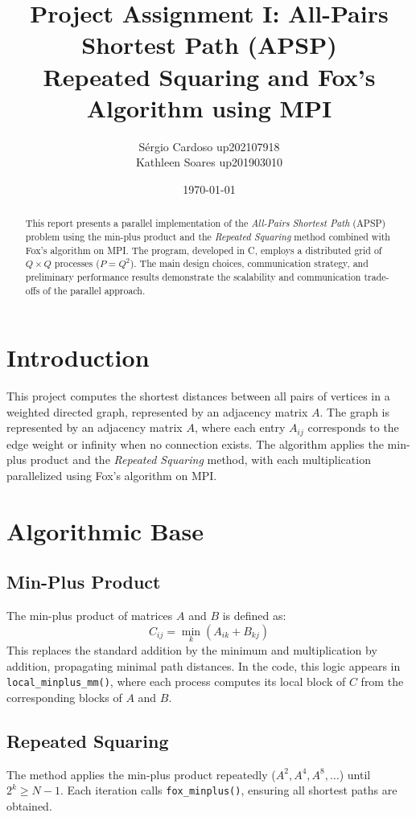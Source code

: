 \documentclass[10pt,a4paper]{article}
\title{\textbf{Project Assignment I: All-Pairs Shortest Path (APSP)}\\
\large Repeated Squaring and Fox’s Algorithm using MPI}
\author{Sérgio Cardoso up202107918 \\ Kathleen Soares up201903010}
\date{\today}
\begin{document}
\maketitle

\begin{abstract}
This report presents a parallel implementation of the \emph{All-Pairs Shortest Path} (APSP) problem using the min-plus product and the \emph{Repeated Squaring} method combined with Fox's algorithm on MPI. The program, developed in C, employs a distributed grid of \(Q \times Q\) processes (\(P = Q^2\)). The main design choices, communication strategy, and preliminary performance results demonstrate the scalability and communication trade-offs of the parallel approach.
\end{abstract}

\section{Introduction}
This project computes the shortest distances between all pairs of vertices in a weighted directed graph, represented by an adjacency matrix \(A\). The graph is represented by an adjacency matrix \(A\), where each entry \(A_{ij}\) corresponds to the edge weight or infinity when no connection exists.
 The algorithm applies the min-plus product and the \emph{Repeated Squaring} method, with each multiplication parallelized using Fox’s algorithm on MPI.

\section{Algorithmic Base}

\subsection{Min-Plus Product}
The min-plus product of matrices \(A\) and \(B\) is defined as:
\[
C_{ij} = \min_k (A_{ik} + B_{kj})
\]
This replaces the standard addition by the minimum and multiplication by addition, propagating minimal path distances. In the code, this logic appears in \texttt{local\_minplus\_mm()}, where each process computes its local block of \(C\) from the corresponding blocks of \(A\) and \(B\).

\subsection{Repeated Squaring}
The method applies the min-plus product repeatedly (\(A^2, A^4, A^8, \ldots\)) until \(2^k \ge N-1\). Each iteration calls \texttt{fox\_minplus()}, ensuring all shortest paths are obtained.
\end{document}
